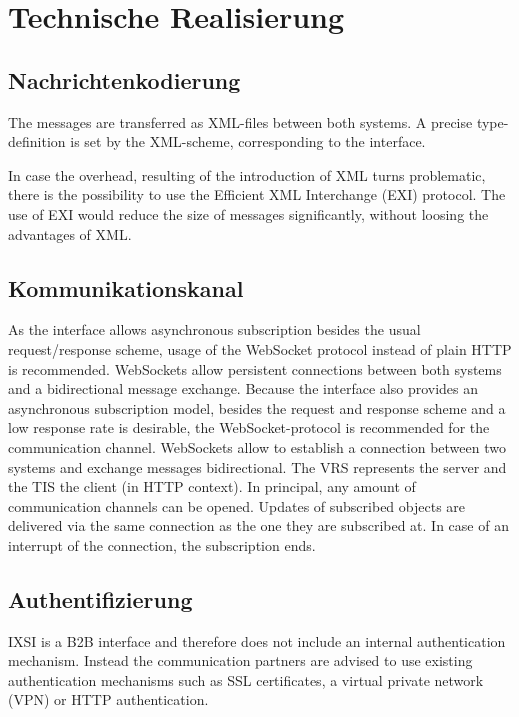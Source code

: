 \chapter{Technische Realisierung}
\label{sec:TechnischeRealisierung}


\section{Nachrichtenkodierung}
The messages are transferred as XML-files between both systems. A precise type-definition is set by the XML-scheme, corresponding to the interface.

In case the overhead, resulting of the introduction of XML turns problematic, there is the possibility to use the Efficient XML Interchange (EXI) protocol. The use of EXI would reduce the size of messages significantly, without loosing the advantages of XML. 

\section{Kommunikationskanal}
As the interface allows asynchronous subscription besides the usual request/response scheme, usage of the WebSocket protocol instead of plain HTTP is recommended.
WebSockets allow persistent connections between both systems and a bidirectional message exchange. Because the interface also provides an asynchronous subscription model, besides the request and response scheme and a low response rate is desirable, the WebSocket-protocol is recommended for the communication channel. WebSockets allow to establish a connection between two systems and exchange messages bidirectional. The VRS represents the server and the TIS the client (in HTTP context). In principal, any amount of communication channels can be opened. Updates of subscribed objects are delivered via the same connection as the one they are subscribed at. In case of an interrupt of the connection, the subscription ends.

\section{Authentifizierung}
IXSI is a B2B interface and therefore does not include an internal authentication mechanism. Instead the communication partners are advised to use existing authentication mechanisms such as SSL certificates, a virtual private network (VPN) or HTTP authentication.


